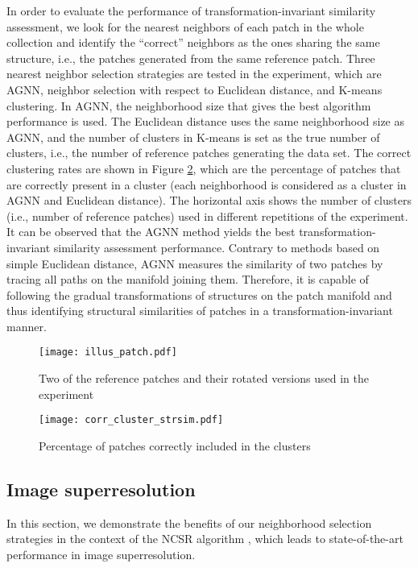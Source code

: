 \documentclass[journal]{IEEEtran}
\begin{document}
In order to evaluate the performance of transformation-invariant similarity assessment, we look for the nearest neighbors of each patch in the whole collection and identify the ``correct'' neighbors as the ones sharing the same structure, i.e., the patches generated from the same reference patch. Three nearest neighbor selection strategies are tested in the experiment, which are AGNN, neighbor selection with respect to Euclidean distance, and K-means clustering. In AGNN, the neighborhood size that gives the best algorithm performance is used. The Euclidean distance uses the same neighborhood size as AGNN, and the number of clusters in K-means is set as the true number of clusters, i.e., the number of reference patches generating the data set.  The correct clustering rates are shown in Figure \ref{fig:corr_cluster_strsim}, which are the percentage of patches that are correctly present in a cluster (each neighborhood is considered as a cluster in AGNN and Euclidean distance). The horizontal axis shows the number of clusters (i.e., number of reference patches) used in different repetitions of the experiment. It can be observed that the AGNN method yields the best transformation-invariant similarity assessment performance. Contrary to methods based on simple Euclidean distance, AGNN measures the similarity of two patches by tracing all paths on the manifold joining them. Therefore, it is capable of following the gradual transformations of structures on the patch manifold and thus identifying structural similarities of patches in a transformation-invariant manner.

\begin{figure}[!t]
\centering
\texttt{[image: illus\_patch.pdf]}
\caption{Two of the reference patches and their rotated versions used in the experiment}
\label{fig:illus_patch_strsim}
\end{figure}

\begin{figure}[!t]
\centering
\texttt{[image: corr\_cluster\_strsim.pdf]}
\caption{Percentage of patches correctly included in the clusters}
\label{fig:corr_cluster_strsim}
\end{figure}



\subsection{Image superresolution}
\label{ssec:exp_superres}

In this section, we demonstrate the benefits of our neighborhood selection strategies in the context of the NCSR algorithm \cite{Dong13nonlocally}, which leads to state-of-the-art performance in image superresolution.
\end{document}
